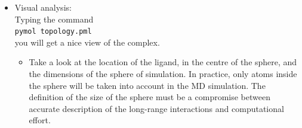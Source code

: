 \documentclass[a4paper,12pt]{article}
\newcommand{\qprep}{\texttt{Qprep5}}
\begin{document}
\begin {itemize}
\begin {itemize}
    \item {\texttt { readprm ../FF{\_}Q/Qoplsaa.prm}}
    \item {\texttt { readpdb complex.pdb}}
    \item {\texttt { addbond 5480 6383 y}} (to form the bond between the Fe atom and the S of Cys 348; 
        "y" indicates that we accept the 2.2 {\AA} bond length. Note, that the atom numbers forming the bond can be found by typing
         {\texttt { listseq}} to see the sequence and {\texttt { listres}} to see the atom numbers in a given residue)
    \item {\texttt {boundary sphere 407:C1 18}} (the centre of the 18 {\AA} radius sphere of simulation will be the central atom of the ligand, indicated by residue:atom{\_}name)
    \item {\texttt {solvate 407:C1 18 1 HOH}} (solvate with TIP3P waters the sphere of simulation)
    \item {\texttt {maketop "cma compex topology"}} (make the topology, giving a title for it)
    \item {\texttt {writetop cma.top}}
    \item {\texttt {writepdb cma{\_}top.pdb y}} (we will have a pdb of the starting coordinates of the system; "y" indicates write GAP between molecules)
    \item {\texttt {quit}}
    \end {itemize}
We have generated the topology file, \texttt{cma.top}, which will be the file used as input for the MD simulation.\\
Alternatively you can write all {\qprep} commands in a separate
file ({\it e.g.} \texttt{maketop.inp} and run {\qprep} {\texttt {<
maketop.inp > maketop.log}}, so you can carefully analyze the
output given by the program.

\item Visual analysis: \\
Typing the command \\
\texttt{pymol topology.pml} \\
you will get a nice view of the complex.
\begin {itemize}
\item Take a look at the location of the ligand, in the centre of the sphere, and the dimensions of the sphere of simulation. In practice, only atoms inside the sphere will be taken into account in the MD simulation. The definition of the size of the sphere must be a compromise between accurate description of the long-range interactions and computational effort.
\end {itemize}
\end {itemize}
\end{document}
